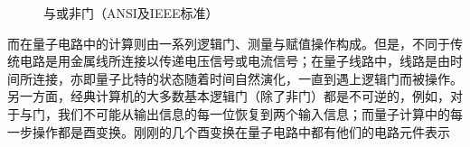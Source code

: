 \begin{figure}[H]
    \centering    %

    \caption{与或非门（ANSI及IEEE标准）} %
    \label{fig:and-or-not-gate}  %
\end{figure}

而在量子电路中的计算则由一系列逻辑门、测量与赋值操作构成。但是，不同于传统电路是用金属线所连接以传递电压信号或电流信号；在量子线路中，线路是由时间所连接，亦即量子比特的状态随着时间自然演化，一直到遇上逻辑门而被操作。另一方面，经典计算机的大多数基本逻辑门（除了非门）都是不可逆的，例如，对于与门，我们不可能从输出信息的每一位恢复到两个输入信息；而量子计算中的每一步操作都是酉变换。刚刚的几个酉变换在量子电路中都有他们的电路元件表示

